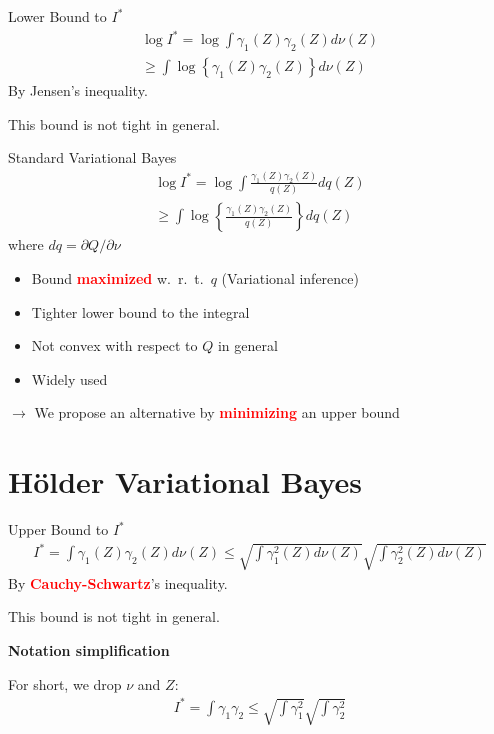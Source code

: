 \documentclass{beamer}
\newcommand{\Holder}{H\"older\xspace}
\newcommand{\q}{q}
\newcommand{\Expectation}[2]{\int{#2}d\nu(\Z)}
\def\Z{Z}
\renewcommand{\emph}[1]{\textcolor{red}{\textbf{#1}}}
\begin{document}
\begin{frame}{Lower Bound to $I^*$}
	\begin{eqnarray}
	\log I^*= \log \Expectation{}{\gamma_1(\Z)\gamma_2(\Z)}
	\\
	\ge \int \log\left\lbrace\gamma_1(\Z)\gamma_2(\Z)\right\rbrace d\nu(\Z)
	\end{eqnarray}
	By Jensen's inequality.
	
	This bound is not tight in general.
\end{frame}
\begin{frame}{Standard Variational Bayes}
	\begin{eqnarray}
	\log I^*= \log \int \frac{\gamma_1(\Z)\gamma_2(\Z)}{q(\Z)} d\q(\Z)
	\\
	\ge \int \log\left\lbrace \frac{\gamma_1(\Z)\gamma_2(\Z)}{q(\Z)} \right\rbrace d\q(\Z)
	\end{eqnarray}
	where $dq=\partial Q/\partial \nu$
	\begin{itemize}
		\item Bound \emph{maximized} w.~r.~t.~$\q$ (Variational inference)
		\item Tighter lower bound to the integral
		\item Not convex with respect to $Q$ in general
		\item Widely used
	\end{itemize}
	$\rightarrow$ We propose an alternative by \emph{minimizing} an upper bound
\end{frame}


\section{\Holder Variational Bayes}

\begin{frame}{Upper Bound to $I^*$}
	\begin{eqnarray}
	I^*= \Expectation{}{\gamma_1(\Z)\gamma_2(\Z)}
	\le 
	\sqrt{\int \gamma^2_1(\Z)d\nu(\Z)} 
	\sqrt{\int \gamma^2_2(\Z)d\nu(\Z)}
	\end{eqnarray}
	By \emph{Cauchy-Schwartz}'s inequality.
	
	This bound is not tight in general.
	
	\vspace{1cm}
	\textbf{Notation simplification}
	
	For short, we drop $\nu$ and $\Z$:
	\begin{eqnarray}
	I^*= \int \gamma_1\gamma_2
	\le 
	\sqrt{\int \gamma^2_1} 
	\sqrt{\int \gamma^2_2}
	\end{eqnarray}	
\end{frame}
\end{document}
